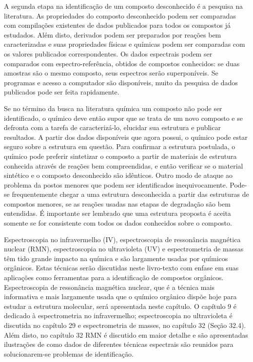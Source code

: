 A segunda etapa na identificação de um composto desconhecido é a pesquisa na literatura. As propriedades do composto desconhecido podem ser comparadas com compilações existentes de dados publicados para todos os compostos já estudados. Além disto, derivados podem ser preparados por reações bem caracterizadas e suas propriedades físicas e químicas podem ser comparadas com os valores publicados correspondentes. Os dados espectrais podem ser comparados com espectro-referência, obtidos de compostos conhecidos: se duas amostras são o mesmo composto, seus espectros serão superponíveis. Se programas e acesso a computador são disponíveis, muito da pesquisa de dados publicados pode ser feita rapidamente.

Se no término da busca na literatura química um composto não pode ser identificado, o químico deve então supor que se trata de um novo composto e se defronta com a tarefa de caracterizá-lo, elucidar sua estrutura e publicar resultados. A partir dos dados disponíveis que agora possui, o químico pode estar seguro sobre a estrutura em questão. Para confirmar a estrutura postulada, o químico pode preferir sintetizar o composto a partir de materiais de estrutura conhecida através de reações bem compreendidas, e então verificar se o material sintético e o composto desconhecido são idênticos. Outro modo de ataque ao problema da postos menores que podem ser identificados inequivocamente. Pode-se frequentemente chegar a uma estrutura desconhecida a partir das estruturas de compostos menores, se as reações usadas nas etapas de degradação são bem entendidas. É importante ser lembrado que uma estrutura proposta é aceita somente se for consistente com todos os dados conhecidos sobre o composto.

Espectroscopia no infravermelho (IV), espectroscopia de ressonância magnética nuclear (RMN), espectroscopia no ultravioleta (UV) e espectrometria de massas têm tido grande impacto na química e são largamente usadas por químicos orgânicos. Estas técnicas serão discutidas neste livro-texto com enfase em suas aplicações como ferramentas para a identificação de compostos orgânicos. Espectroscopia de ressonância magnética nuclear, que é a técnica mais informativa e mais largamente usada que o químico orgânico dispõe hoje para estudar a estrutura molecular, será apresentada neste capítulo. O capítulo 9 é dedicado à espectrometria no infravermelho; espectroscopia no ultravioleta é discutida no capítulo 29 e espectrometria de masses, no capítulo 32 (Seção 32.4). Além disto, no capítulo 32 RMN é discutido em maior detalhe e são apresentadas ilustrações de como dados de diferentes técnicas espectrais são reunidos para solucionarem-se problemas de identificação.

